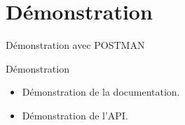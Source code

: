 \section{Démonstration}

\begin{frame}{Démonstration avec POSTMAN}
  \begin{block}{Démonstration}
    \begin{itemize}
    \item Démonstration de la documentation.
    \item Démonstration de l'API.
    \end{itemize}
  \end{block}
\end{frame}
